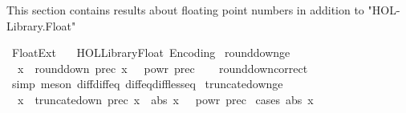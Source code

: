 %
\begin{isabellebody}%
%
%
\isadelimdocument
%
\endisadelimdocument
%
\isatagdocument
%
\isamarkuptrue%
%
\endisatagdocument
{\isafolddocument}%
%
\isadelimdocument
%
\endisadelimdocument
%
\begin{isamarkuptext}%
This section contains results about floating point numbers in addition to "HOL-Library.Float"%
\end{isamarkuptext}\isamarkuptrue%
%
\isadelimtheory
%
\endisadelimtheory
%
\isatagtheory
{}\isamarkupfalse%
\ Float{\isacharunderscore}{\kern0pt}Ext\isanewline
\ \ \ {\isachardoublequoteopen}HOL{\isacharminus}{\kern0pt}Library{\isachardot}{\kern0pt}Float{\isachardoublequoteclose}\ Encoding\isanewline
{}%
\endisatagtheory
{\isafoldtheory}%
%
\isadelimtheory
%
\endisadelimtheory
\isanewline
\isanewline
{}\isamarkupfalse%
\ round{\isacharunderscore}{\kern0pt}down{\isacharunderscore}{\kern0pt}ge{\isacharcolon}{\kern0pt}\isanewline
\ \ {\isachardoublequoteopen}x\ {\isasymle}\ round{\isacharunderscore}{\kern0pt}down\ prec\ x\ {\isacharplus}{\kern0pt}\ {}\ powr\ {\isacharparenleft}{\kern0pt}{\isacharminus}{\kern0pt}prec{\isacharparenright}{\kern0pt}{\isachardoublequoteclose}\isanewline
%
\isadelimproof
\ \ %
\endisadelimproof
%
\isatagproof
{}\isamarkupfalse%
\ round{\isacharunderscore}{\kern0pt}down{\isacharunderscore}{\kern0pt}correct\ \isamarkupfalse%
\ {\isacharparenleft}{\kern0pt}simp{\isacharcomma}{\kern0pt}\ meson\ diff{\isacharunderscore}{\kern0pt}diff{\isacharunderscore}{\kern0pt}eq\ diff{\isacharunderscore}{\kern0pt}eq{\isacharunderscore}{\kern0pt}diff{\isacharunderscore}{\kern0pt}less{\isacharunderscore}{\kern0pt}eq{\isacharparenright}{\kern0pt}%
\endisatagproof
{\isafoldproof}%
%
\isadelimproof
\isanewline
%
\endisadelimproof
\isanewline
{}\isamarkupfalse%
\ truncate{\isacharunderscore}{\kern0pt}down{\isacharunderscore}{\kern0pt}ge{\isacharcolon}{\kern0pt}\isanewline
\ \ {\isachardoublequoteopen}x\ {\isasymle}\ truncate{\isacharunderscore}{\kern0pt}down\ prec\ x\ {\isacharplus}{\kern0pt}\ abs\ x\ {\isacharasterisk}{\kern0pt}\ {}\ powr\ {\isacharparenleft}{\kern0pt}{\isacharminus}{\kern0pt}prec{\isacharparenright}{\kern0pt}{\isachardoublequoteclose}\isanewline
%
\isadelimproof
%
\endisadelimproof
%
\isatagproof
{}\isamarkupfalse%
\ {\isacharparenleft}{\kern0pt}cases\ {\isachardoublequoteopen}abs\ x\ {\isachargreater}{\kern0pt}\ {}{\isachardoublequoteclose}{\isacharparenright}{\kern0pt}\isanewline

\end{isabellebody}
